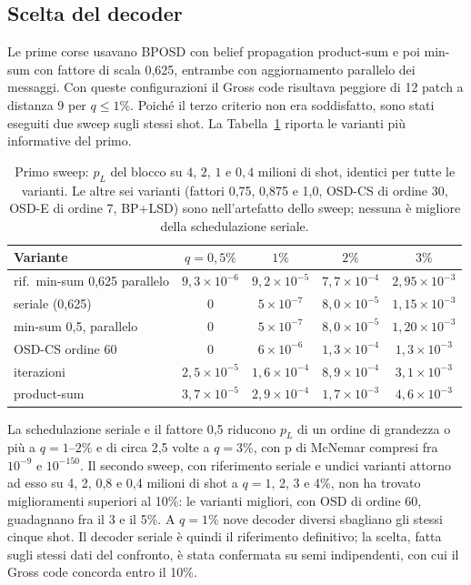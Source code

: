 \begin{onehalfspace}
\subsection{Scelta del decoder}
\label{app:gross_decoder}

Le prime corse usavano \ac{BPOSD} con belief propagation product-sum e
poi min-sum con fattore di scala 0,625, entrambe con aggiornamento
parallelo dei messaggi. Con queste configurazioni il Gross code
risultava peggiore di 12 patch a distanza 9 per $q \le 1\%$. Poiché il
terzo criterio non era soddisfatto, sono stati eseguiti due sweep sugli
stessi shot. La Tabella~\ref{tab:app_gross_sweep} riporta le varianti
più informative del primo.

\begin{table}[H]

\centering
\small
\begin{tabular}{@{}lcccc@{}}
\toprule
\textbf{Variante} & $q = 0{,}5\%$ & $1\%$ & $2\%$ & $3\%$ \\
\midrule
rif.\ min-sum 0,625 parallelo & $9{,}3\times10^{-6}$ & $9{,}2\times10^{-5}$ & $7{,}7\times10^{-4}$ & $2{,}95\times10^{-3}$ \\
\addlinespace[0.3em]
seriale (0,625) & 0 & $5\times10^{-7}$ & $8{,}0\times10^{-5}$ & $1{,}15\times10^{-3}$ \\
\addlinespace[0.3em]
min-sum 0,5, parallelo & 0 & $5\times10^{-7}$ & $8{,}0\times10^{-5}$ & $1{,}20\times10^{-3}$ \\
\addlinespace[0.3em]
OSD-CS ordine 60 & 0 & $6\times10^{-6}$ & $1{,}3\times10^{-4}$ & $1{,}3\times10^{-3}$ \\
\addlinespace[0.3em]
1000 iterazioni & $2{,}5\times10^{-5}$ & $1{,}6\times10^{-4}$ & $8{,}9\times10^{-4}$ & $3{,}1\times10^{-3}$ \\
\addlinespace[0.3em]
product-sum & $3{,}7\times10^{-5}$ & $2{,}9\times10^{-4}$ & $1{,}7\times10^{-3}$ & $4{,}6\times10^{-3}$ \\
\bottomrule
\end{tabular}
\caption[Sweep del decoder sul Gross code]{Primo sweep: $p_L$ del
blocco su $4$, $2$, $1$ e $0{,}4$ milioni di shot, identici per tutte le
varianti. Le altre sei varianti (fattori 0,75, 0,875 e 1,0, OSD-CS di
ordine 30, OSD-E di ordine 7, BP+LSD) sono nell'artefatto dello sweep;
nessuna è migliore della schedulazione seriale.}\label{tab:app_gross_sweep}

\end{table}

La schedulazione seriale e il fattore 0,5 riducono $p_L$ di un ordine di
grandezza o più a $q = 1$--$2\%$ e di circa 2,5 volte a $q = 3\%$, con p
di McNemar compresi fra $10^{-9}$ e $10^{-150}$. Il secondo sweep, con
riferimento seriale e undici varianti attorno ad esso su 4, 2, 0,8 e 0,4
milioni di shot a $q = 1$, 2, 3 e 4\%, non ha trovato miglioramenti
superiori al 10\%: le varianti migliori, con OSD di ordine 60, guadagnano
fra il 3 e il 5\%. A $q = 1\%$ nove decoder diversi sbagliano gli stessi
cinque shot. Il decoder seriale è quindi il riferimento definitivo; la
scelta, fatta sugli stessi dati del confronto, è stata confermata su semi
indipendenti, con cui il Gross code concorda entro il 10\%.


\end{onehalfspace}
